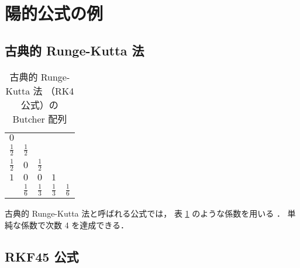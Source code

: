 %

\section{陽的公式の例}

\subsection{古典的 Runge-Kutta 法}

\begin{table}[bp]
    \caption{古典的 Runge-Kutta 法 （RK4 公式）の Butcher 配列}
    \label{table:ode_runge-kutta_butcher-array-rk4}
    \centering
    \begin{tabular}{c|cccc}
        $0$           &               &               &               &               \\
        $\frac{1}{2}$ & $\frac{1}{2}$ &               &               &               \\
        $\frac{1}{2}$ & $0$           & $\frac{1}{2}$ &               &               \\
        $1$           & $0$           & $0$           & $1$           &               \\
        \hline
                      & $\frac{1}{6}$ & $\frac{1}{3}$ & $\frac{1}{3}$ & $\frac{1}{6}$
    \end{tabular}
\end{table}

古典的 Runge-Kutta 法と呼ばれる公式では，
表 \ref{table:ode_runge-kutta_butcher-array-rk4} のような係数を用いる
\cite[3.3 節]{Mitsui1993}．
単純な係数で次数 4 を達成できる．

\subsection{RKF45 公式}

